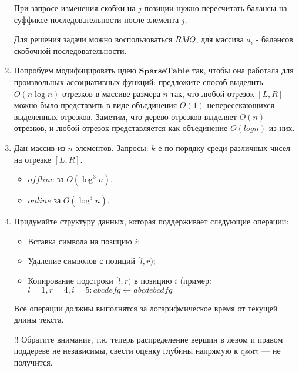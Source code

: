 \begin{enumerate}
	При запросе изменения скобки на $j$ позиции нужно пересчитать балансы на суффиксе 
	последовательности после элемента $j$.
	
	Для решения задачи можно воспользоваться $RMQ$, для массива $a_i$ - балансов скобочной 
	последовательности.
	
	\item Попробуем модифицировать идею $\mathbf{SparseTable}$ так, чтобы она работала для 
	произвольных ассоциативных функций: предложите способ выделить $O(n \log n)$ отрезков в 
	массиве размера $n$ так, что любой отрезок $[L, R]$ можно было представить в виде 
	объединения $O(1)$ непересекающихся выделенных отрезков. Заметим, что дерево отрезков 
	выделяет $O(n)$ отрезков, и любой отрезок представляется как объединение $O(log n)$ из них.
	
	
	\item Дан массив из $n$ элементов. Запросы: $k$-е по порядку среди различных чисел на отрезке $[L, R]$.
	\begin{itemize}
		\item $offline$ за $O(\log^3 n)$.
		\item $online$ за $O(\log^3 n)$.
	\end{itemize}
	
	\item Придумайте структуру данных, которая поддерживает следующие операции:
	
	\begin{itemize}
		\item Вставка символа на позицию $i$;
		\item Удаление символов с позиций $[l, r)$;
		\item Копирование подстроки $[l, r)$ в позицию $i$ (пример: $l = 1, r = 4, i = 5 : abcdefg \leftarrow abcdebcdfg$
	\end{itemize}
	
	Все операции должны выполнятся за логарифмическое время от текущей длины текста.
		
	!! Обратите внимание, т.к. теперь распределение вершин в левом и правом поддереве не 
	независимы, свести оценку глубины напрямую к qsort — не получится.
		
\end{enumerate}


